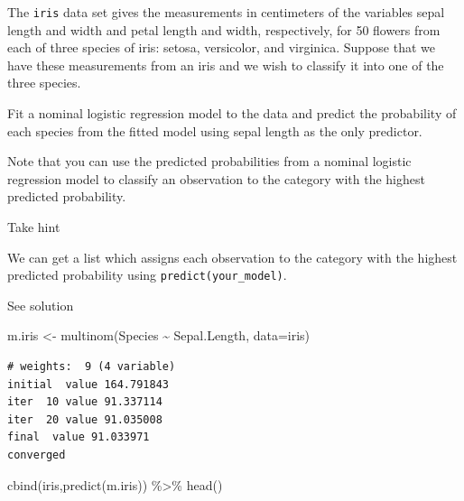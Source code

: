 \documentclass[
  letterpaper,
  DIV=11,
  numbers=noendperiod]{scrartcl}
\newenvironment{Shaded}{\begin{snugshade}}{\end{snugshade}}
\newcommand{\AttributeTok}[1]{\textcolor[rgb]{0.40,0.45,0.13}{#1}}
\newcommand{\FunctionTok}[1]{\textcolor[rgb]{0.28,0.35,0.67}{#1}}
\newcommand{\NormalTok}[1]{\textcolor[rgb]{0.00,0.23,0.31}{#1}}
\newcommand{\OtherTok}[1]{\textcolor[rgb]{0.00,0.23,0.31}{#1}}
\newcommand{\SpecialCharTok}[1]{\textcolor[rgb]{0.37,0.37,0.37}{#1}}
\begin{document}
\begin{tcolorbox}[enhanced jigsaw, leftrule=.75mm, arc=.35mm, colback=white, opacityback=0, breakable, title={Task}, toprule=.15mm, opacitybacktitle=0.6, titlerule=0mm, rightrule=.15mm, bottomtitle=1mm, coltitle=black, toptitle=1mm, colframe=quarto-callout-warning-color-frame, bottomrule=.15mm, colbacktitle=quarto-callout-warning-color!10!white, left=2mm]

The \texttt{iris} data set gives the measurements in centimeters of the
variables sepal length and width and petal length and width,
respectively, for 50 flowers from each of three species of iris: setosa,
versicolor, and virginica. Suppose that we have these measurements from
an iris and we wish to classify it into one of the three species.

Fit a nominal logistic regression model to the data and predict the
probability of each species from the fitted model using sepal length as
the only predictor.

Note that you can use the predicted probabilities from a nominal
logistic regression model to classify an observation to the category
with the highest predicted probability.

Take hint

We can get a list which assigns each observation to the category with
the highest predicted probability using \texttt{predict(your\_model)}.

See solution

\begin{Shaded}
\begin{Highlighting}[]
\NormalTok{m.iris }\OtherTok{\textless{}{-}} \FunctionTok{multinom}\NormalTok{(Species }\SpecialCharTok{\textasciitilde{}}\NormalTok{ Sepal.Length, }\AttributeTok{data=}\NormalTok{iris)}
\end{Highlighting}
\end{Shaded}

\begin{verbatim}
# weights:  9 (4 variable)
initial  value 164.791843 
iter  10 value 91.337114
iter  20 value 91.035008
final  value 91.033971 
converged
\end{verbatim}

\begin{Shaded}
\begin{Highlighting}[]
\FunctionTok{cbind}\NormalTok{(iris,}\FunctionTok{predict}\NormalTok{(m.iris)) }\SpecialCharTok{\%\textgreater{}\%} \FunctionTok{head}\NormalTok{()}
\end{Highlighting}
\end{Shaded}


\end{tcolorbox}
\end{document}
